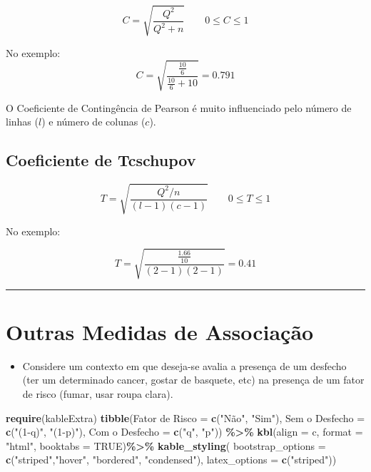 \documentclass[
]{book}
\newenvironment{Shaded}{\begin{snugshade}}{\end{snugshade}}
\newcommand{\AttributeTok}[1]{\textcolor[rgb]{0.13,0.29,0.53}{#1}}
\newcommand{\ConstantTok}[1]{\textcolor[rgb]{0.56,0.35,0.01}{#1}}
\newcommand{\FunctionTok}[1]{\textcolor[rgb]{0.13,0.29,0.53}{\textbf{#1}}}
\newcommand{\NormalTok}[1]{#1}
\newcommand{\OtherTok}[1]{\textcolor[rgb]{0.56,0.35,0.01}{#1}}
\newcommand{\SpecialCharTok}[1]{\textcolor[rgb]{0.81,0.36,0.00}{\textbf{#1}}}
\newcommand{\StringTok}[1]{\textcolor[rgb]{0.31,0.60,0.02}{#1}}
\providecommand{\tightlist}{%
  \setlength{\itemsep}{0pt}\setlength{\parskip}{0pt}}
\begin{document}
\[C = \sqrt{\frac{Q^2}{Q^2 + n}} \qquad 0\leq C\leq1\]

No exemplo:\\
\[C = \sqrt{\frac{\frac{10}{6}}{\frac{10}{6} + 10}} = 0.791\]

O Coeficiente de Contingência de Pearson é muito influenciado pelo número de linhas (\(l\)) e número de colunas (\(c\)).

\subsection{Coeficiente de Tcschupov}\label{coeficiente-de-tcschupov}

\[T = \sqrt{\frac{Q^2/n}{(l - 1) (c - 1)}} \qquad 0\leq T\leq1\]

No exemplo:

\[T = \sqrt{\frac{\frac{1.66}{10}}{(2 - 1) (2 - 1)}} = 0.41\]

\begin{center}\rule{0.5\linewidth}{0.5pt}\end{center}

\section{Outras Medidas de Associação}\label{outras-medidas-de-associauxe7uxe3o}

\begin{itemize}
\tightlist
\item
  Considere um contexto em que deseja-se avalia a presença de um desfecho (ter um determinado cancer, gostar de basquete, etc) na presença de um fator de risco (fumar, usar roupa clara).
\end{itemize}

\begin{Shaded}
\begin{Highlighting}[]
\FunctionTok{require}\NormalTok{(kableExtra)}
\FunctionTok{tibble}\NormalTok{(}\StringTok{\textquotesingle{}Fator de Risco\textquotesingle{}} \OtherTok{=} \FunctionTok{c}\NormalTok{(}\StringTok{"Não"}\NormalTok{, }\StringTok{"Sim"}\NormalTok{), }
       \StringTok{\textquotesingle{}Sem o Desfecho\textquotesingle{}} \OtherTok{=} \FunctionTok{c}\NormalTok{(}\StringTok{"(1{-}q)"}\NormalTok{, }\StringTok{"(1{-}p)"}\NormalTok{), }
       \StringTok{\textquotesingle{}Com o Desfecho\textquotesingle{}} \OtherTok{=} \FunctionTok{c}\NormalTok{(}\StringTok{"q"}\NormalTok{, }\StringTok{"p"}\NormalTok{)) }\SpecialCharTok{\%\textgreater{}\%} 
  \FunctionTok{kbl}\NormalTok{(}\AttributeTok{align =} \StringTok{\textquotesingle{}c\textquotesingle{}}\NormalTok{, }\AttributeTok{format =} \StringTok{"html"}\NormalTok{, }\AttributeTok{booktabs =} \ConstantTok{TRUE}\NormalTok{)}\SpecialCharTok{\%\textgreater{}\%} 
  \FunctionTok{kable\_styling}\NormalTok{(}
     \AttributeTok{bootstrap\_options =} \FunctionTok{c}\NormalTok{(}\StringTok{"striped"}\NormalTok{,}\StringTok{"hover"}\NormalTok{, }\StringTok{"bordered"}\NormalTok{, }\StringTok{"condensed"}\NormalTok{), }
     \AttributeTok{latex\_options =} \FunctionTok{c}\NormalTok{(}\StringTok{"striped"}\NormalTok{))}
\end{Highlighting}
\end{Shaded}
\end{document}
